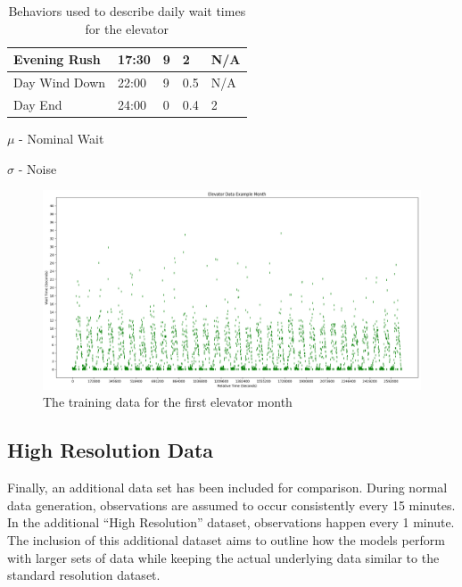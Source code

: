 \begin{table}[!htb]
\begin{tabular}{|l|l|l|l|l|}
      Evening Rush           & 17:30    & 9                                 & 2                             & N/A      \\ \hline
      Day Wind Down          & 22:00    & 9                                 & 0.5                           & N/A      \\ \hline
      Day End                & 24:00    & 0                                 & 0.4                           & 2        \\ \hline
    \end{tabular}
    \begin{tablenotes}
      \small
      \item $\mu$ - Nominal Wait
      \item $\sigma$ - Noise
    \end{tablenotes}
    \caption{Behaviors used to describe daily wait times for the elevator}
    \label{table:elevator_day_t}
  \end{table}



  \begin{figure}[!htb]
    \centering
    \includegraphics[width=\linewidth]{images/Elevator_Data_Example_Month.png}
    \caption{The training data for the first elevator month}
    \label{figure:Elevator Training Data}
  \end{figure}


  \subsection{ High Resolution Data }

  Finally, an additional data set has been included for comparison. During
  normal data generation, observations are assumed to occur consistently every
  15 minutes. In the additional ``High Resolution'' dataset, observations happen
  every 1 minute. The inclusion of this additional dataset aims to outline how
  the models perform with larger sets of data while keeping the actual
  underlying data similar to the standard resolution dataset.


